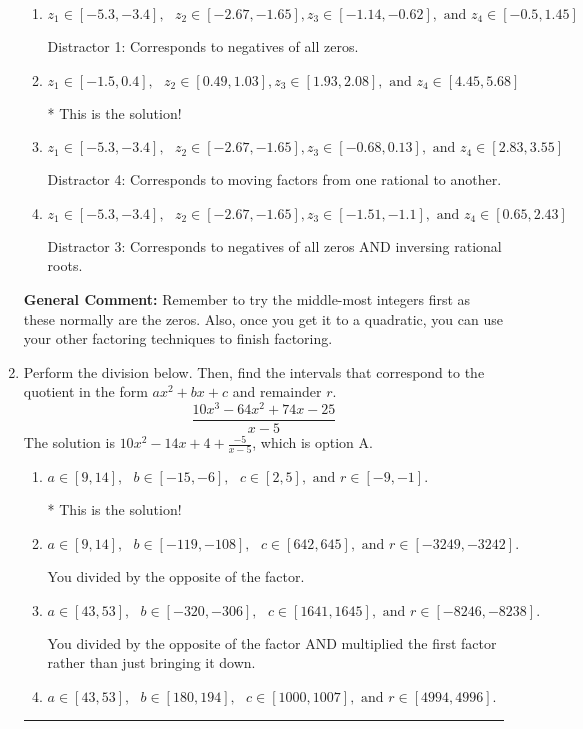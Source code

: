 \documentclass{extbook}[14pt]
\newcommand{\litem}[1]{\item #1

\rule{\textwidth}{0.4pt}}
\begin{document}
\begin{enumerate}
{\begin{enumerate}[label=\Alph*.]
 Distractor 2: Corresponds to inversing rational roots.
\item \( z_1 \in [-5.3, -3.4], \text{   }  z_2 \in [-2.67, -1.65], z_3 \in [-1.14, -0.62], \text{   and   } z_4 \in [-0.5, 1.45] \)

 Distractor 1: Corresponds to negatives of all zeros.
\item \( z_1 \in [-1.5, 0.4], \text{   }  z_2 \in [0.49, 1.03], z_3 \in [1.93, 2.08], \text{   and   } z_4 \in [4.45, 5.68] \)

* This is the solution!
\item \( z_1 \in [-5.3, -3.4], \text{   }  z_2 \in [-2.67, -1.65], z_3 \in [-0.68, 0.13], \text{   and   } z_4 \in [2.83, 3.55] \)

 Distractor 4: Corresponds to moving factors from one rational to another.
\item \( z_1 \in [-5.3, -3.4], \text{   }  z_2 \in [-2.67, -1.65], z_3 \in [-1.51, -1.1], \text{   and   } z_4 \in [0.65, 2.43] \)

 Distractor 3: Corresponds to negatives of all zeros AND inversing rational roots.
\end{enumerate}

\textbf{General Comment:} Remember to try the middle-most integers first as these normally are the zeros. Also, once you get it to a quadratic, you can use your other factoring techniques to finish factoring.
}
\litem{
Perform the division below. Then, find the intervals that correspond to the quotient in the form $ax^2+bx+c$ and remainder $r$.
\[ \frac{10x^{3} -64 x^{2} +74 x -25}{x -5} \]The solution is \( 10x^{2} -14 x + 4 + \frac{-5}{x -5} \), which is option A.\begin{enumerate}[label=\Alph*.]
\item \( a \in [9, 14], \text{   } b \in [-15, -6], \text{   } c \in [2, 5], \text{   and   } r \in [-9, -1]. \)

* This is the solution!
\item \( a \in [9, 14], \text{   } b \in [-119, -108], \text{   } c \in [642, 645], \text{   and   } r \in [-3249, -3242]. \)

 You divided by the opposite of the factor.
\item \( a \in [43, 53], \text{   } b \in [-320, -306], \text{   } c \in [1641, 1645], \text{   and   } r \in [-8246, -8238]. \)

 You divided by the opposite of the factor AND multiplied the first factor rather than just bringing it down.
\item \( a \in [43, 53], \text{   } b \in [180, 194], \text{   } c \in [1000, 1007], \text{   and   } r \in [4994, 4996]. \)


\end{enumerate}}
\end{enumerate}
\end{document}
